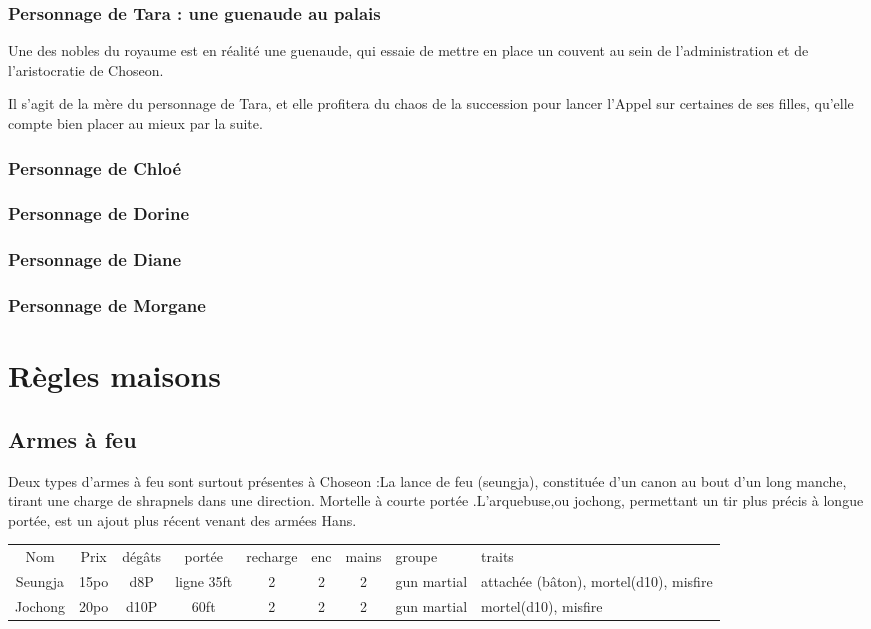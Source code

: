 \documentclass[10pt,a4paper]{book}
\begin{document}
\subsection{Personnage de Tara : une guenaude au palais}
Une des nobles du royaume est en réalité une guenaude, qui essaie de mettre en place un couvent au sein de l'administration et de l'aristocratie de Choseon.

Il s'agit de la mère du personnage de Tara, et elle profitera du chaos de la succession pour lancer l'Appel sur certaines de ses filles, qu'elle compte bien placer au mieux par la suite.

\subsection{Personnage de Chloé}
\subsection{Personnage de Dorine}

\subsection{Personnage de Diane}
\subsection{Personnage de Morgane}
\chapter{Règles maisons}
\section{Armes à feu}
Deux types d'armes à feu sont surtout présentes à Choseon :La lance de feu (seungja), constituée d'un canon au bout d'un long manche, tirant une charge de shrapnels dans une direction. Mortelle à courte portée .L'arquebuse,ou jochong, permettant un tir plus précis à longue portée, est un ajout plus récent venant des armées Hans.

\flushleft
\begin{tabular}{c c c c c c c p{} p{}}
Nom & Prix & dégâts & portée & recharge & enc & mains & groupe & traits \\
Seungja & 15po & d8P & ligne 35ft & 2 & 2 & 2 & gun martial & attachée (bâton), mortel(d10), misfire \\
Jochong & 20po & d10P & 60ft & 2 & 2 & 2 & gun martial & mortel(d10), misfire\\
\end{tabular}
\end{document}
